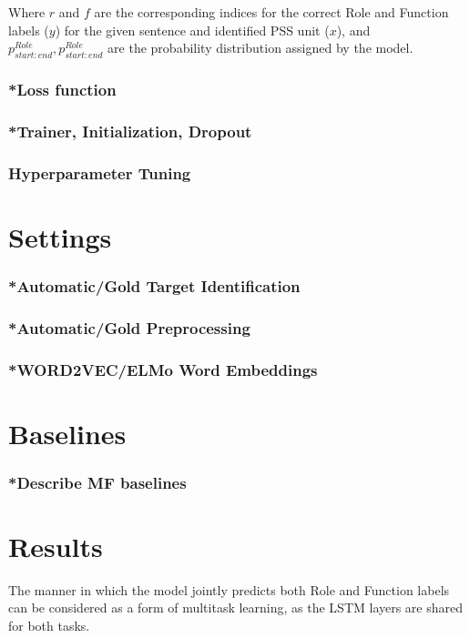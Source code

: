 Where $r$ and $f$ are the corresponding indices for the correct Role and Function labels ($y$) for the given sentence and identified PSS unit ($x$), and $p^{Role}_{start:end}, p^{Role}_{start:end}$ are the probability distribution assigned by the model.
\subsubsection{*Loss function}
\subsubsection{*Trainer, Initialization, Dropout}
\subsubsection{Hyperparameter Tuning}

\section{Settings} \label{sec:psssettings}
\subsubsection{*Automatic/Gold Target Identification}
\subsubsection{*Automatic/Gold Preprocessing}
\subsubsection{*WORD2VEC/ELMo Word Embeddings}

\section{Baselines} \label{sec:pssbaselines}
\subsubsection{*Describe MF baselines}

\section{Results} \label{sec:pssresults}

The manner in which the model jointly predicts both Role and Function labels can be considered as a form of multitask learning, as the LSTM layers are shared for both tasks.

